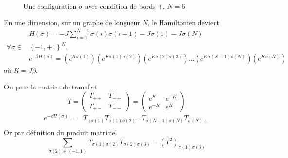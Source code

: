 \documentclass[french]{beamer}
\begin{document}
\begin{frame}
\begin{figure}
    \centering
    \caption{Une configuration $\sigma$ avec condition de bords $+$, $N = 6$}
\end{figure}

En une dimension, sur un graphe de longueur $N$, le Hamiltonien devient
\begin{align*}
&H(\sigma) = -J \sum_{i = 1}^{N - 1} \sigma(i) \sigma(i + 1) - J \sigma(1) -J\sigma(N) \\
 \forall \sigma \in &\left\{-1, +1\right\}^N,\\
&e^{-\beta H(\sigma)} = (e^{K\sigma(1)})(e^{K\sigma(1)\sigma(2)}) (e^{K\sigma(2)\sigma(3)}) \dots (e^{K\sigma(N-1)\sigma(N)}) (e^{K\sigma(N)})
\end{align*}
où $K = J \beta$.
\end{frame}

\begin{frame}
On pose la matrice de transfert
   \[T =
   \begin{pmatrix}
   T_{++} & T_{-+} \\
   T_{+-}  &  T_{--}
   \end{pmatrix}
   =
   \begin{pmatrix}
   e^{K}& e^{-K} \\
   e^{-K} & e^{K}
   \end{pmatrix}
   \]
   \begin{align*}
   e^{-\beta H(\sigma)} =& T_{+\sigma(1)} T_{\sigma(1)\sigma(2)} \dots T_{\sigma(N-1)\sigma(N)} T_{\sigma(N)+}\\
   \end{align*}
   Or par définition du produit matriciel\[
   \sum_{\sigma(2) \in \left\{-1, 1\right\}} T_{\sigma(1)\sigma(2)}T_{\sigma(2)\sigma(3)} = \left(T^2\right)_{\sigma(1)\sigma(3)}
   \]
\end{frame}
\end{document}
